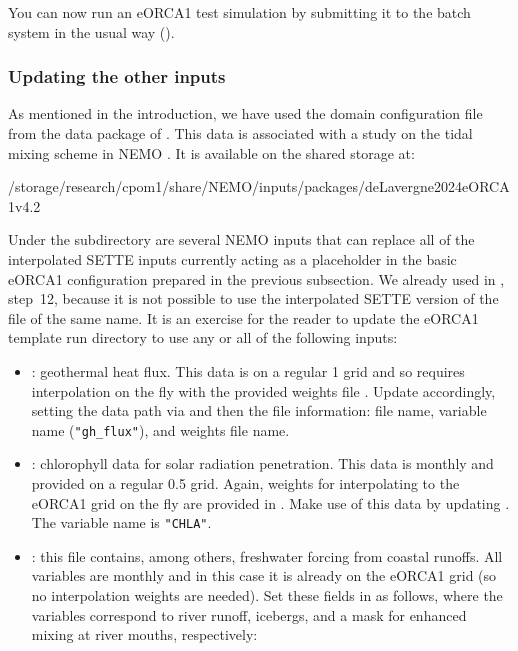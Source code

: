 You can now run an eORCA1 test simulation by submitting it to the batch system in the usual way ().


\subsubsection{Updating the other inputs}
\label{sec:grids-eorca1-other-inputs}

As mentioned in the introduction, we have used the domain configuration file from the data package of \citet{delavergne2024eorca1}.
This data is associated with a study on the tidal mixing scheme in NEMO \citep{delavergne2026effects}.
It is available on the shared storage at:

\begingroup\footnotesize
\begin{VerbatimFile}
/storage/research/cpom1/share/NEMO/inputs/packages/deLavergne2024eORCA1v4.2
\end{VerbatimFile}
\endgroup

Under the  subdirectory are several NEMO inputs that can replace all of the interpolated SETTE inputs currently acting as a placeholder in the basic eORCA1 configuration prepared in the previous subsection.
We already used  in , step~12, because it is not possible to use the interpolated SETTE version of the file of the same name.
It is an exercise for the reader to update the eORCA1 template run directory to use any or all of the following inputs:
\begin{itemize}
    \item {}: geothermal heat flux.
        This data is on a regular 1\textdegree{} grid and so requires interpolation on the fly with the provided weights file .
        Update  accordingly, setting the data path via  and then the file information: file name, variable name (\texttt{"gh_flux"}), and weights file name.
    \item {}: chlorophyll data for solar radiation penetration.
        This data is monthly and provided on a regular 0.5\textdegree{} grid.
        Again, weights for interpolating to the eORCA1 grid on the fly are provided in .
        Make use of this data by updating .
        The variable name is \texttt{"CHLA"}.
    \item {}: this file contains, among others, freshwater forcing from coastal runoffs.
        All variables are monthly and in this case it is already on the eORCA1 grid (so no interpolation weights are needed).
        Set these fields in  as follows, where the variables correspond to river runoff, icebergs, and a mask for enhanced mixing at river mouths, respectively:
\end{itemize}

